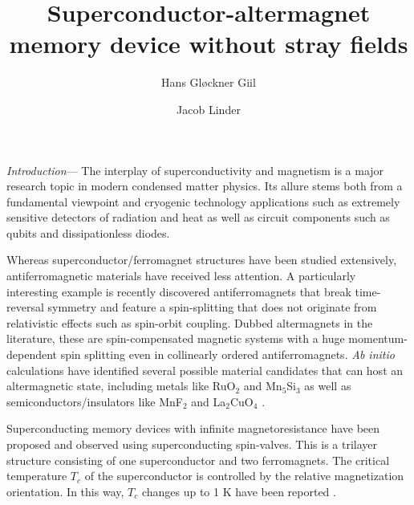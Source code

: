 \documentclass[aps,twocolumn,amsmath,amssymb,preprintnumbers,floatfix,prl,superscriptaddress,longbibliography]{revtex4-2}%
\begin{document}
\title{Superconductor-altermagnet memory device without stray fields}
\author{Hans Gløckner Giil}

\author{Jacob Linder}


\begin{abstract}
\lipsum[1][1-20]



\end{abstract}
\maketitle

\textit{Introduction}---
The interplay of superconductivity and magnetism is a  major research topic in modern condensed matter physics. Its allure stems both from a fundamental viewpoint and cryogenic technology applications such as extremely sensitive detectors of radiation and heat as well as circuit components such as qubits and dissipationless diodes.  

Whereas superconductor/ferromagnet structures have been studied extensively, antiferromagnetic materials have received less attention. A particularly interesting example is recently discovered antiferromagnets that break time-reversal symmetry and feature a spin-splitting that does not originate from relativistic effects such as spin-orbit coupling. Dubbed altermagnets in the literature, these are spin-compensated magnetic systems with a huge momentum-dependent spin splitting even in collinearly ordered antiferromagnets. \textit{Ab initio} calculations have identified several possible material candidates that can host an altermagnetic state, including metals like RuO$_2$ and Mn$_5$Si$_3$ as well as semiconductors/insulators like MnF$_2$ and La$_2$CuO$_4$ 
\cite{yuan_prb_20, lopez-moreno_pccp_16, smejkal_sciadv_20, reichlova_arxiv_20, smejkal_prx_22}.

Superconducting memory devices with infinite magnetoresistance have been proposed and observed \cite{li_prl_13} using superconducting spin-valves. This is a trilayer structure consisting of one superconductor and two ferromagnets. The critical temperature $T_c$ of the superconductor is controlled by the relative magnetization orientation. In this way, $T_c$ changes up to 1 K have been reported \cite{singh_prx_15}.
\end{document}
